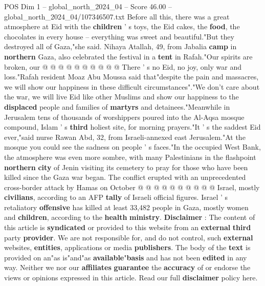 \begin{textsample}{POS Dim 1 – global\_north\_2024\_04 – Score 46.00 – global\_north\_2024\_04/107346507.txt}
Before all this, there was a great atmosphere at Eid with the \textbf{children} ' s toys, the Eid cakes, the \textbf{food}, the chocolates in every house -- everything was sweet and beautiful."But they destroyed all of Gaza,"she said.
Nihaya Atallah, 49, from Jabalia \textbf{camp} in \textbf{northern} Gaza, also celebrated the festival in a \textbf{tent} in Rafah."Our spirits are broken, our @ @ @ @ @ @ @ @ @ @ There ' s no Eid, no joy, only war and loss."Rafah resident Moaz Abu Moussa said that"despite the pain and massacres, we will show our happiness in these difficult circumstances"."We don't care about the war, we will live Eid like other Muslims and show our happiness to the \textbf{displaced} people and families of \textbf{martyrs} and detainees."Meanwhile in Jerusalem tens of thousands of worshippers poured into the Al-Aqsa mosque compound, Islam ' s \textbf{third} holiest site, for morning prayers."It ' s the saddest Eid ever,"said nurse Rawan Abd, 32, from Israeli-annexed east Jerusalem."At the mosque you could see the sadness on people ' s faces."In the occupied West Bank, the atmosphere was even more sombre, with many Palestinians in the flashpoint \textbf{northern} \textbf{city} of Jenin visiting its cemetery to pray for those who have been killed since the Gaza war began.
The conflict erupted with an unprecedented cross-border attack by Hamas on October @ @ @ @ @ @ @ @ @ @ Israel, mostly \textbf{civilians}, according to an AFP \textbf{tally} of Israeli official figures.
Israel ' s retaliatory \textbf{offensive} has killed at least 33,482 people in Gaza, mostly women and \textbf{children}, according to the \textbf{health} \textbf{ministry}. \textbf{Disclaimer} : The content of this article is \textbf{syndicated} or provided to this website from an \textbf{external} \textbf{third} party \textbf{provider}.
We are not responsible for, and do not control, such \textbf{external} websites, \textbf{entities}, applications or media \textbf{publishers}.
The body of the \textbf{text} is provided on an"as is"and"as \textbf{available}"\textbf{basis} and has not been \textbf{edited} in any way.
Neither we nor our \textbf{affiliates} \textbf{guarantee} the \textbf{accuracy} of or endorse the views or opinions expressed in this article.
Read our full \textbf{disclaimer} policy here.

\end{textsample}

